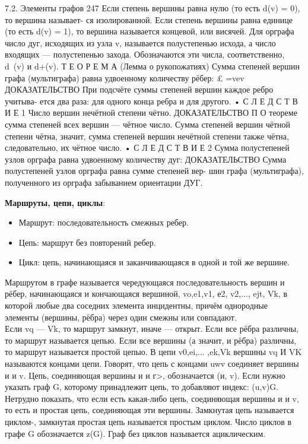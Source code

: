 \documentclass[
]{article}
\providecommand{\tightlist}{%
  \setlength{\itemsep}{0pt}\setlength{\parskip}{0pt}}
\begin{document}
\begin{enumerate}
{{{7.2. Элементы графов 247
Если степень вершины равна нулю (то есть d(v) = 0), то вершина называет-
ся изолированной. Если степень вершины равна единице (то есть d(v) = 1), то
вершина называется концевой, или висячей. Для орграфа число дуг, исходящих
из узла v, называется полустепенью исхода, а число входящих — полустепенью
захода. Обозначаются эти числа, соответственно, d~(v) и d+(v).
Т Е О Р Е М А (Лемма о рукопожатиях) Сумма степеней вершин графа (мультиграфа)
равна удвоенному количеству рёбер:
£ =vev
ДОКАЗАТЕЛЬСТВО При подсчёте суммы степеней вершин каждое ребро учитыва-
ется два раза: для одного конца ребра и для другого. •
С Л Е Д С Т В И Е 1 Число вершин нечётной степени чётно.
ДОКАЗАТЕЛЬСТВО П О теореме сумма степеней всех вершин — чётное число. Сумма
степеней вершин чётной степени чётна, значит, сумма степеней вершин нечётной
степени также чётна, следовательно, их чётное число. •
С Л Е Д С Т В И Е 2 Сумма полустепеней узлов орграфа равна удвоенному количеству
дуг:
ДОКАЗАТЕЛЬСТВО Сумма полустепеней узлов орграфа равна сумме степеней вер-
шин графа (мультиграфа), полученного из орграфа забыванием ориентации
ДУГ. 

\item
  \textbf{Маршруты, цепи, циклы}:

  \begin{itemize}
  \tightlist
  \item
    Маршрут: последовательность смежных ребер.
  \item
    Цепь: маршрут без повторений ребер.
  \item
    Цикл: цепь, начинающаяся и заканчивающаяся в одной и той же вершине.
  \end{itemize}
Маршрутом в графе называется чередующаяся последовательность вершин и
рёбер, начинающаяся и кончающаяся вершиной, vo,e1,v1, е2, v2,..., ejt, Vk, в которой любые два соседних элемента инцидентны, причём однородные элементы
(вершины, рёбра) через один смежны или совпадают.\\ 
Если vq — Vk, то маршрут замкнут, иначе — открыт. Если все рёбра различны,
то маршрут называется цепью. Если все вершины (а значит, и рёбра) различны,
то маршрут называется простой цепыо. В цепи v0,ei,... ,ek,Vk вершины vq И VK
называются концами цепи. Говорят, что цепь с концами uwv соединяет вершины
и и v. Цепь, соединяющая вершины и и г>, обозначается (и, v). Если нужно указать
граф G, которому принадлежит цепь, то добавляют индекс: (u,v)G. Нетрудно
показать, что если есть какая-либо цепь, соединяющая вершины и и v, то есть
и простая цепь, соединяющая эти вершины. Замкнутая цепь называется циклом-,
замкнутая простая цепь называется простым циклом. Число циклов в графе G
обозначается z(G). Граф без циклов называется ациклическим.\\ 

}}}
\end{enumerate}
\end{document}
